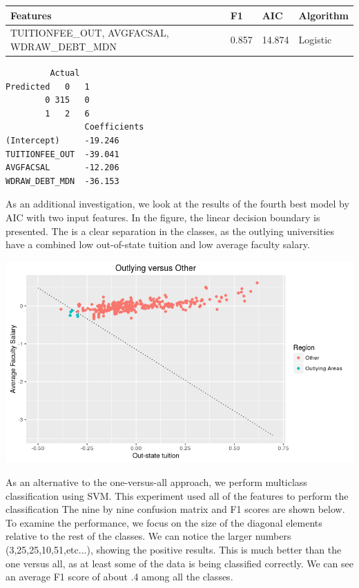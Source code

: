 \documentclass[10pt]{article}
\begin{document}
\begin{center}
\begin{tabular}{ |P{4cm}|P{2cm}|P{2cm}|P{2cm}| }
 \hline Features & F1 & AIC & Algorithm \\ \hline
 TUITIONFEE\_OUT, AVGFACSAL, WDRAW\_DEBT\_MDN  & 0.857 & 14.874 & Logistic \\ \hline 
\end{tabular}
\end{center}

\begin{lstlisting}
         Actual
Predicted   0   1
        0 315   0
        1   2   6
                Coefficients
(Intercept)     -19.246 
TUITIONFEE_OUT  -39.041
AVGFACSAL       -12.206
WDRAW_DEBT_MDN  -36.153 
\end{lstlisting}

As an additional investigation, we look at the results of the fourth best model by AIC with two input features. In the figure, the linear decision boundary is presented. The is a clear separation in the classes, as the outlying universities have a combined low out-of-state tuition and low average faculty salary.

\includegraphics[width=\textwidth]{figures/outlying3}

As an alternative to the one-versus-all approach, we perform multiclass classification using SVM. This experiment used all of the features to perform the classification The nine by nine confusion matrix and F1 scores are shown below. To examine the performance, we focus on the size of the diagonal elements relative to the rest of the classes. We can notice the larger numbers (3,25,25,10,51,etc...), showing the positive results. This is much better than the one versus all, as at least some of the data is being classified correctly. We can see an average F1 score of about .4 among all the classes.
\end{document}
